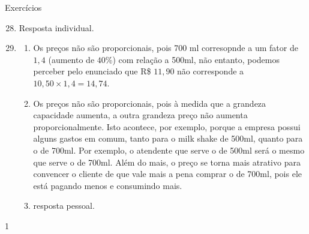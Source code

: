 \clearmargin
\begin{answer}{Exercícios}
{\exerciselist

  \begin{enumerate}\setcounter{enumi}{27}
    \item Resposta individual.
    \item
    \begin{enumerate}
      \item Os preços não são proporcionais, pois 700 ml corresopnde a um fator de $1{,}4$ (aumento de $40$\%) com relação a 500ml, não entanto, podemos perceber pelo enunciado que R\$ $11{,}90$ não corresponde a $10{,}50\times1{,}4=14{,}74$.
      \item Os preços não são proporcionais, pois à medida que a grandeza capacidade aumenta, a outra grandeza preço não aumenta proporcionalmente. Isto acontece, por exemplo, porque a empresa possui alguns gastos em comum, tanto para o milk shake de 500ml, quanto para o de 700ml. Por exemplo, o atendente que serve o de 500ml será o mesmo que serve o de 700ml. Além do mais, o preço se torna mais atrativo para convencer o cliente de que vale mais a pena comprar o de 700ml, pois ele está pagando menos e consumindo mais.
      \item resposta pessoal.
    \end{enumerate}
  \end{enumerate}  
}{1}
\end{answer}
\exercise


